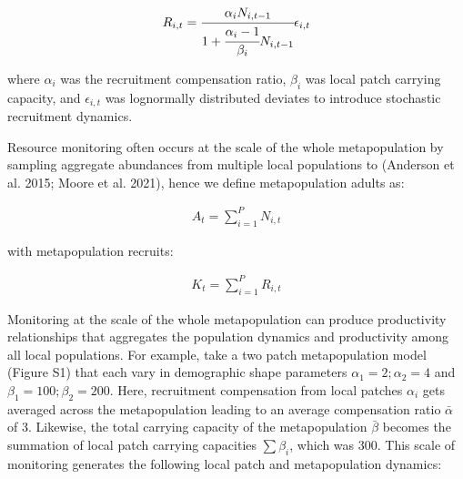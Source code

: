 \documentclass[
]{article}
\begin{document}
\begin{align}
R_{i,t}=\cfrac{\alpha_iN_{i,t-1}}{1+\cfrac{\alpha_i-1}{\beta_i}N_{i,t-1}}\epsilon_{i,t}
\end{align}

where \(\alpha_i\) was the recruitment compensation ratio, \(\beta_i\)
was local patch carrying capacity, and \(\epsilon_{i,t}\) was
lognormally distributed deviates to introduce stochastic recruitment
dynamics.

Resource monitoring often occurs at the scale of the whole
metapopulation by sampling aggregate abundances from multiple local
populations to (Anderson et al. 2015; Moore et al. 2021), hence we
define metapopulation adults as:

\begin{align}
{A}_t = \sum_{i=1}^{P} N_{i,t}
\end{align}

with metapopulation recruits:

\begin{align}
K_t = \sum_{i=1}^{P} R_{i,t}
\end{align}

Monitoring at the scale of the whole metapopulation can produce
productivity relationships that aggregates the population dynamics and
productivity among all local populations. For example, take a two patch
metapopulation model (Figure S1) that each vary in demographic shape
parameters \(\alpha_1=2; \alpha_2=4\) and \(\beta_1=100; \beta_2=200\).
Here, recruitment compensation from local patches \(\alpha_i\) gets
averaged across the metapopulation leading to an average compensation
ratio \(\bar{\alpha}\) of 3. Likewise, the total carrying capacity of
the metapopulation \(\bar{\beta}\) becomes the summation of local patch
carrying capacities \(\sum\beta_i\), which was 300. This scale of
monitoring generates the following local patch and metapopulation
dynamics:
\end{document}
